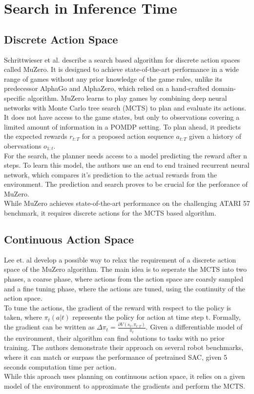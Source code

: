 \section{Search in Inference Time}
\subsection{Discrete Action Space}

Schrittwieser et al. \cite{MUZero} describe a search based algorithm for discrete action spaces called MuZero. It is designed to achieve state-of-the-art performance 
in a wide range of games without any prior knowledge of the game rules, unlike its predecessor AlphaGo and AlphaZero, which relied on a hand-crafted 
domain-specific algorithm. MuZero learns to play games by combining deep neural networks with Monte Carlo tree search (MCTS) to plan and evaluate its actions. 
It does not have access to the game states, but only to observations covering a limited amount of information in a POMDP setting.
To plan ahead, it predicts the expected rewards $r_{t:T}$ for a proposed action sequence $a_{t:T}$ given a history of obervsations $o_{1:t}$.\\
For the search, the planner needs access to a model predicting the reward after n steps. To learn this model, the authors use an end to end trained recurrent neural network, which 
compares it's prediction to the actual rewards from the environment. The prediction and search proves to be crucial for the perforance of MuZero.\\ 
While MuZero achieves state-of-the-art performance on the challenging ATARI 57 benchmark, it requires discrete actions for the MCTS based algorithm.

\subsection{Continuous Action Space}
\label{sec:mctsca}
Lee et. al \cite{Lee_Jeon_Kim_Kim_2020} develop a possible way to relax the requirement of a discrete action space of the MuZero algorithm. 
The main idea is to seperate 
the MCTS into two phases, a coarse phase, where actions from the action space are coarsly sampled and a fine tuning phase, where the actions are tuned, using the continuity of the action space.\\
To tune the actions, the gradient of the reward with respect to the policy is taken, where $\pi_t(a|t)$ represents the policy for action at time step t. 
Formally, the gradient can be written as $\Delta \pi_t = \frac{\partial V (s_t, \pi_{t:T})}{\pi_{t}}$. Given a differentiable model of the environment, their algorithm can 
find solutions to tasks with no prior training. The authors demonstrate their approach on several robot 
benchmarks, where it can match or surpass the performance of pretrained SAC, given 5 seconds computation time per action.\\
While this aproach uses planning on continuous action space, it relies on a given model of the environment to approximate the gradients and perform the MCTS.